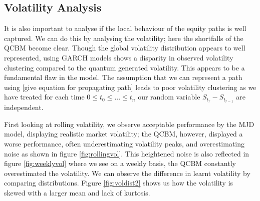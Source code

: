 \documentclass[12pt]{article}
\newcommand{\newp}
    {
    \vskip 0.5cm 
  }
\numberwithin{equation}{section}
\begin{document}
\subsection{Volatility Analysis}
It is also important to analyse if the local behaviour of the equity paths is well 
captured. We can do this by analysing the volatility; here the shortfalls of the 
QCBM become clear. Though the global volatility distribution appears to well 
represented, using GARCH models shows a disparity in observed volatility clustering 
compared to the quantum generated volatility. This appears to be a fundamental 
flaw in the model. The assumption that we can represent a path using [give 
equation for propagating path] leads to poor volatility clustering as we have 
treated for each time $0\leq t_0 \leq ...\leq t_n$ our random variable 
$S_{t_r}-S_{t_{r-1}}$ are independent.
\newp 
First looking at rolling volatility, we observe acceptable performance by the 
MJD model, displaying realistic market volatility; the QCBM, however, displayed 
a worse performance, often underestimating volatility peaks, and overestimating 
noise as shown in figure \ref{fig:rollingvol}.
This heightened noise is also reflected 
in figure \ref{fig:weeklyvol} where we see on a weekly basis, the QCBM 
constantly overestimated the volatility. We can observe the difference in learnt 
volatility by comparing distributions. Figure \ref{fig:voldist2} shows us how the 
volatility is skewed with a larger mean and lack of kurtosis. 
\end{document}
